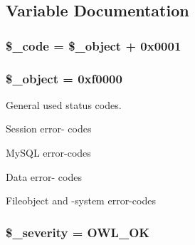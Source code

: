 \subsection{Variable Documentation}
\hypertarget{owl_8statuscodes_8php_b644cddc92f48f9d33fe59e882fdf058}{
\subsubsection{\setlength{\rightskip}{0pt plus 5cm}\$\_\-code = \$\_\-object + 0x0001}}
\label{owl_8statuscodes_8php_b644cddc92f48f9d33fe59e882fdf058}


\hypertarget{owl_8statuscodes_8php_7943a1fdb8789bfab359ae90f133b5ad}{
\subsubsection{\setlength{\rightskip}{0pt plus 5cm}\$\_\-object = 0xf0000}}
\label{owl_8statuscodes_8php_7943a1fdb8789bfab359ae90f133b5ad}


General used status codes.

Session error- codes

MySQL error-codes

Data error- codes

Fileobject and -system error-codes \hypertarget{owl_8statuscodes_8php_75d6a2c33fa55d95b674d43759b59743}{
\subsubsection{\setlength{\rightskip}{0pt plus 5cm}\$\_\-severity = {\bf OWL\_\-OK}}}
\label{owl_8statuscodes_8php_75d6a2c33fa55d95b674d43759b59743}


